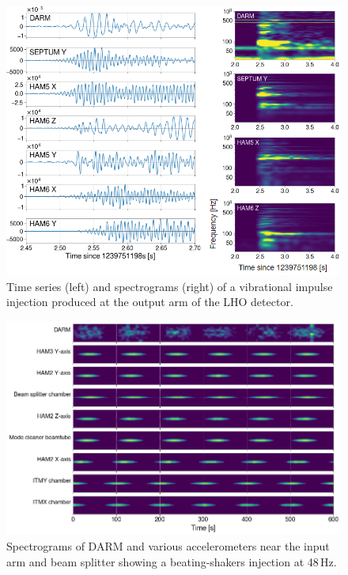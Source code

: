 \documentclass[11pt]{article}
\begin{document}
\begin{figure}[h!]
	\centering
	\includegraphics[width=\textwidth]{figures/noise-impulse.png}
	\caption{
		Time series (left) and spectrograms (right) of a vibrational impulse injection produced at the output arm of the LHO detector.}
	\label{fig:noise_impulse}
\end{figure}

\begin{figure}[h!]
	\centering
	\includegraphics[width=\textwidth]{figures/noise-beat-spectrograms.png}
	\caption{
		Spectrograms of DARM and various accelerometers near the input arm and beam splitter showing a beating-shakers injection at 48\,Hz.}
	\label{fig:noise_beats}
\end{figure}
\end{document}
